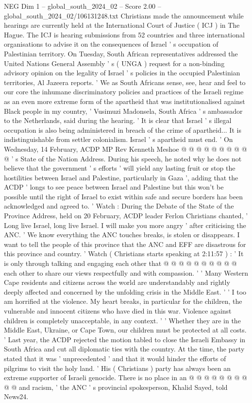 \begin{textsample}{NEG Dim 1 – global\_south\_2024\_02 – Score 2.00 – global\_south\_2024\_02/106131248.txt}  \label{ex:f1_neg_427}
Christians made the announcement while hearings are currently held at the International Court of Justice ( ICJ ) in The Hague.
The ICJ is hearing submissions from 52 countries and three international organisations to advise it on the consequences of Israel ' s occupation of Palestinian territory.
On Tuesday, South African representatives addressed the United Nations General Assembly ' s ( UNGA ) request for a non-binding advisory opinion on the legality of Israel ' s policies in the occupied Palestinian territories, Al Jazeera reports. ' We as South Africans sense, see, hear and feel to our core the inhumane discriminatory policies and practices of the Israeli regime as an even more extreme form of the apartheid that was institutionalised against Black people in my country, ' Vusimuzi Madonsela, South Africa ' s ambassador to the Netherlands, said during the hearing. ' It is clear that Israel ' s illegal occupation is also being administered in breach of the crime of apartheid...
It is indistinguishable from settler colonialism.
Israel ' s apartheid must end. ' On Wednesday, 14 February, ACDP MP Rev Kenneth Meshoe @ @ @ @ @ @ @ @ @ @ ' s State of the Nation Address.
During his speech, he noted why he does not believe that the government ' s efforts ' will yield any lasting fruit or stop the hostilities between Israel and Palestine, particularly in Gaza ', adding that the ACDP ' longs to see peace between Israel and Palestine but this won't be possible until the right of Israel to exist within safe and secure borders has been acknowledged and agreed to. ' Watch : During the Debate of the State of the Province Address, held on 20 February, ACDP leader Ferlon Christians chanted, ' Long live Israel, long live Israel.
I will make you more angry ' after criticising the ANC. ' We know everything the ANC touches breaks, is stolen or disappears.
I want to tell the people of this province that the ANC and EFF are disastrous for this province and country. ' Watch ( Christians starts speaking at 2:11:57 ) : ' It is only through talking and engaging each other that @ @ @ @ @ @ @ @ @ @ each other to share our views respectfully and with compassion. ' ' Many Western Cape residents and citizens across the world are understandably and rightly deeply affected and concerned by the unfolding crisis in the Middle East. ' ' I too am horrified at the violence.
My heart breaks, in particular for the children, the vulnerable and innocent citizens who have died in this war.
Violence against children is completely unacceptable, in any context. ' ' Whether they are in the Middle East, Ukraine, or Cape Town, our children must be protected at all costs. ' Last year, the ACDP rejected the motion tabled to close the Israeli Embassy in South Africa and cut all diplomatic ties with the country.
At the time, the party stated that it was ' unprecedented ' and that it would hinder the efforts of pilgrims to visit the holy land. ' His ( Christians ) party has always been an extreme supporter of Israeli genocide.
There is no place in an @ @ @ @ @ @ @ @ @ @ and racism, ' the ANC ' s provincial spokesperson, Khalid Sayed, told News24.

\end{textsample}
